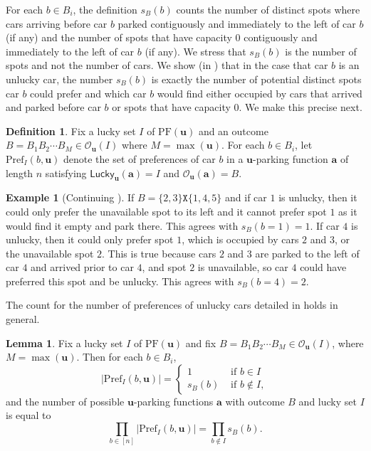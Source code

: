 \documentclass[reqno]{amsart}
\newcommand{\X}{\texttt{X}}
\newcommand{\Pref}{\mathrm{Pref}}
\newcommand{\PF}{\mathrm{PF}}
\newcommand{\Lucky}{\mathsf{Lucky}}
\theoremstyle{definition}
\newtheorem{example}[theorem]{Example}
\newtheorem{lemma}[theorem]{Lemma}
\newtheorem{definition}[theorem]{Definition}
\theoremstyle{remark}
\newcommand{\out}{\mathcal{O}}
\newcommand{\bsy}{\boldsymbol}
\begin{document}
For each $b\in B_i$, the definition $s_B(b)$ counts the number of distinct spots where cars arriving before car $b$ parked contiguously and immediately to the left of car $b$ (if any) and the number of spots that have capacity $0$ contiguously and immediately to the left of car $b$ (if any). We stress that $s_B(b)$ is the number of spots and not the number of cars. We show (in ) that in the case that car $b$ is an unlucky car, the number $s_B(b)$ is exactly the number of potential distinct spots car $b$ could prefer and which car $b$ would find either occupied by cars that arrived and parked before car $b$ or spots that have capacity $0$. We make this precise next.

\begin{definition}
Fix a lucky set $I$ of $\PF(\bsy{u})$ and an outcome $B=B_1B_2\cdots B_M\in \out_{\bsy{u}}(I)$ where $M=\max(\bsy{u})$. For each $b\in B_i$, let $\Pref_I(b,\bsy{u})$ denote the set of preferences of car $b$ in a $\bsy{u}$-parking function $\bsy{a}$ of length $n$ satisfying $\Lucky_{\bsy{u}}(\bsy{a})=I$ and $\out_{\bsy{u}}(\bsy{a})=B$.
\end{definition}

\begin{example}[Continuing ]\label{ex:l function}
If $B=\{2,3\}\X\{1,4,5\}$ and if car $1$ is unlucky, then it could only prefer the unavailable spot to its left and it cannot prefer spot $1$ as it would find it empty and park there. 
This agrees with $s_B(b=1)=1$. If car $4$ is unlucky, then it could only prefer spot $1$, which is occupied by cars $2$ and $3$, or the unavailable spot $2$. This is true because cars $2$ and $3$ are parked to the left of car $4$ and arrived prior to car $4$, and spot $2$ is unavailable, so car $4$ could have preferred this spot and be unlucky. This agrees with $s_B(b=4)=2$.
\end{example}

The count for the number of preferences of unlucky cars detailed in  holds in general.

\begin{lemma}\label{lem:possible prefs given an outcome}
Fix a lucky set $I$ of $\PF(\bsy{u})$ and fix $B=B_1B_2 \cdots B_M\in\out_{\bsy{u}}(I)$, where $M=\max(\bsy{u})$. Then for each $b\in B_i$,
\[|\Pref_I(b,\bsy{u})| 
    = \begin{cases}
      1&\text{ if } b\in I\\
      s_B(b) & \text{ if } b \notin I,
     \end{cases}
    \]
    and the number of possible $\bsy{u}$-parking functions $\bsy{a}$ with outcome $B$ and lucky set $I$ is equal to
\[\prod_{b\in [n]} |\Pref_{I}(b,\bsy{u})|=\prod_{b\notin I}s_B(b).\]

\end{lemma}
\end{document}
